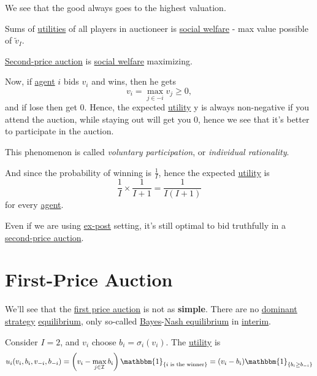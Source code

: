 \begin{remark}
	We see that the good always goes to the highest valuation.
\end{remark}

Sums of \hyperref[def:reward]{utilities} of all players in auctioneer is \hyperref[def:social-welfare]{social welfare} - max value possible of \(\widetilde{v}_{I}\).

\begin{remark}
	\hyperref[eg:second-price-auction]{Second-price auction} is \hyperref[def:social-welfare]{social welfare} maximizing.
\end{remark}

Now, if \hyperref[def:player]{agent} \(i\) bids \(v_{i}\) and wins, then he gets
\[
	v_{i} = \max_{j\in -i} v_{j}\geq 0,
\]
and if lose then get \(0\). Hence, the expected \hyperref[def:reward]{utility} y is always non-negative if you attend the auction, while staying
out will get you \(0\), hence we see that it's better to participate in the auction.

\begin{remark}\label{rmk:voluntary-participation}
	This phenomenon is called \emph{voluntary participation}, or \emph{individual rationality}.
\end{remark}

And since the probability of winning is \(\frac{1}{I}\), hence the expected \hyperref[def:reward]{utility} is
\[
	\frac{1}{I}\times \frac{1}{I+1} = \frac{1}{I(I + 1)}
\]
for every \hyperref[def:player]{agent}.

\begin{note}
	Even if we are using \hyperref[def:ex-post]{ex-post} setting, it's still optimal to bid truthfully in a
	\hyperref[eg:second-price-auction]{second-price auction}.
\end{note}

\section{First-Price Auction}
We'll see that the \hyperref[eg:first-price-auction]{first price auction} is not as \textbf{simple}. There are no \hyperref[def:dominant-strategy]{dominant strategy}
\hyperref[def:Nash-equilibrium]{equilibrium}, only so-called \hyperref[def:mathematical-Bayesian-game]{Bayes}-\hyperref[def:Nash-equilibrium]{Nash equilibrium} in
\hyperref[def:interim]{interim}.

Consider \(I = 2\), and \(v_{i}\) choose \(b_{i} = \sigma_{i}(v_{i})\). The \hyperref[def:reward]{utility}  is
\[
	u_{i}(v_{i}, b_{i}, v_{-i}, b_{-i}) = \left(v_{i} - \max_{j\in \mathcal{I} }b_{i}\right)\mathbbm{1}_{\{ i \text{ is the winner} \}} = (v_{i} - b_{i})\mathbbm{1}_{\{ b_{i}\geq b_{-i} \}}
\]


